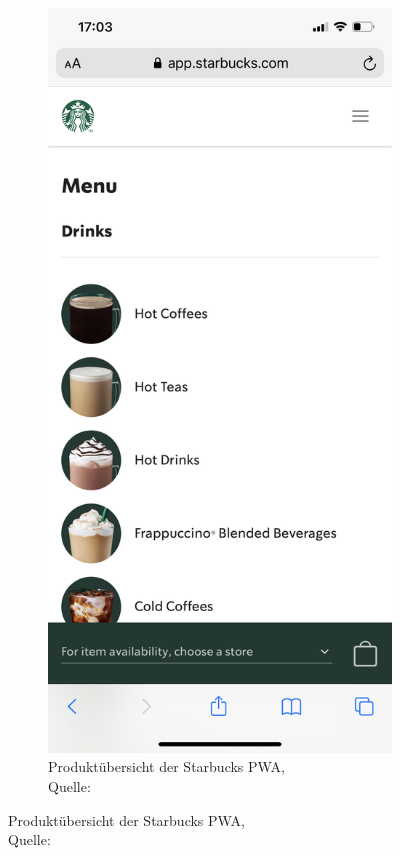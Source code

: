 \begin{figure}[h]
\begin{subfigure}[b]{0.4\textwidth}
		\label{img: Startseite der Starbucks PWA}
	\end{subfigure}
	\hfill
	\begin{subfigure}[b]{0.4\textwidth}
		\includegraphics[scale=0.15]{images/starbucks_angebot.PNG}
		\caption[Produktübersicht der Starbucks \ac{PWA}]{Produktübersicht der Starbucks \ac{PWA},\\ Quelle: \cite{starbucksPwaMenu}}
		\label{img: Produktübersicht der Starbucks PWA}
	\end{subfigure}
\end{figure}

